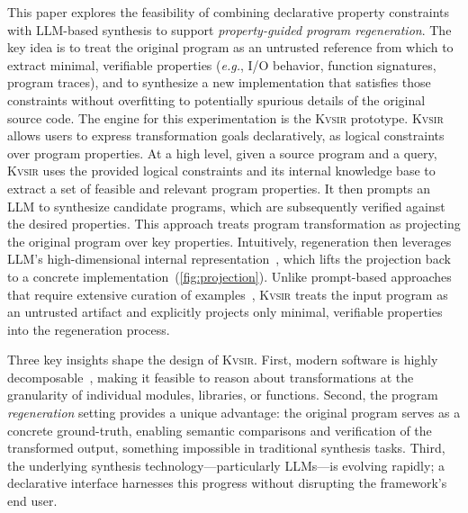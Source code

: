 \documentclass[sigplan,review,anonymous,10pt]{acmart}
\def\eg{{\em e.g.}, }
\newcommand{\sys}{{\scshape Kv{\textalpha}sir}\xspace}
\begin{document}
This paper explores the feasibility of combining declarative property
constraints with LLM-based synthesis to support \emph{property-guided program regeneration}.
The key idea is to treat the original program as an untrusted reference from
which to extract minimal, verifiable properties (\eg I/O behavior,
function signatures, program traces), and to synthesize a new implementation that satisfies those
constraints without overfitting to potentially spurious details of the original source code.
The engine for this experimentation is the \sys prototype.
\sys allows users
to express transformation goals declaratively, as logical constraints over
program properties.
At a high level, given a source program and a query, \sys uses the provided
logical constraints and its internal knowledge base to extract a set of
feasible and relevant program properties.
It then prompts an LLM to synthesize
candidate programs, which are subsequently verified against the desired properties.
This approach treats program transformation as projecting the original program over key properties.
Intuitively, regeneration then leverages LLM's high-dimensional internal representation~\cite{jin2024emergent,tao2024llms,huh2024platonicrepresentationhypothesis}, 
which lifts the projection back to a concrete implementation~(\cref{fig:projection}).
Unlike prompt-based approaches that require
extensive curation of examples~\cite{dilhara2024unprecedented, khattab2023dspy, cummins2024donttransformcodecode},
\sys treats the input program as an
untrusted artifact and explicitly projects only minimal, verifiable properties
into the regeneration process.

Three key insights shape the design of \sys.
First, modern software is highly decomposable~\cite{vfunction2024modular, isoline2018decomposition, schechter2011visualizing, breakapp:ndss:2018}, making it feasible to reason about transformations at the granularity of individual modules, libraries, or functions.
Second, the program \emph{regeneration} setting provides a unique advantage: the original program serves as a concrete ground-truth, enabling semantic comparisons and verification of the transformed output, something impossible in traditional synthesis tasks.
Third, the underlying synthesis technology---particularly LLMs---is evolving rapidly; a declarative interface harnesses this progress without disrupting the framework's end user.

\end{document}
